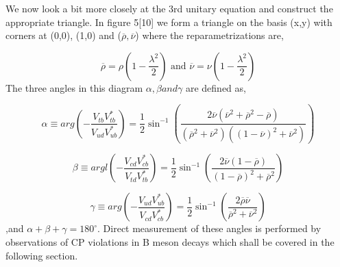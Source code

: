 \documentclass[floatfix,aps,prd,amsmath,amssymb]{revtex4}
\begin{document}
We now look a bit more closely at the 3rd unitary equation and construct the appropriate triangle. In figure {5}[10] we form a triangle on the basis (x,y) with corners at (0,0), (1,0) and ($\overline{\rho},\overline{\nu}$) where the reparametrizations are,

\[\overline{\rho}=\rho\left(1-\frac{\lambda^2}{2}\right) \mbox{ and } \overline{\nu}=\nu\left(1-\frac{\lambda^2}{2}\right)\]
The three angles in this diagram $\alpha , \beta and \gamma$ are defined as,

\[ \alpha\equiv arg\left(-\frac{V_{tb}V^{*}_{tb}}{V_{ud}V^{*}_{ub}}\right) =\frac{1}{2}\sin^{-1}\left(\frac{2\overline{\nu}(\overline{\nu}^2+\overline{\rho}^2-\overline{\rho})}{(\overline{\rho}^2+\overline{\nu}^2)((1-\overline{\nu})^2+\overline{\nu}^2)}\right) \]

\[\beta\equiv argl\left(-\frac{V_{cd}V^{*}_{cb}}{V_{td}V^{*}_{tb}}\right) = \frac{1}{2}\sin^{-1}\left(\frac{2\overline{\nu}(1-\overline{\rho})}{(1-\overline{\rho})^2+\overline{\rho}^2}\right)\]

\[\gamma\equiv arg\left(-\frac{V_{ud}V^{*}_{ub}}{V_{cd}V^{*}_{cb}}\right) = \frac{1}{2}\sin^{-1}\left(\frac{2\overline{\rho}\overline{\nu}}{\overline{\rho}^2+\overline{\nu}^2}\right)\]
,and $\alpha + \beta + \gamma = 180^{\circ}$. Direct measurement of these angles is performed by observations of CP violations in B meson decays which shall be covered in the following section.
\end{document}
